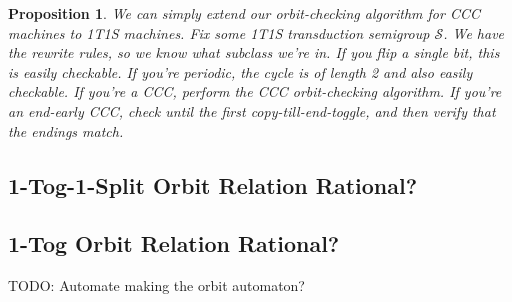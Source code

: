 \documentclass{article}
\newtheorem{proposition}{Proposition}
\newcommand{\0}{\underline{0}}
\newcommand{\1}{\underline{1}}
\newcommand{\2}{\underline{2}}
\renewcommand{\S}{\mathcal{S}}
\begin{document}
\begin{proposition}
We can simply extend our orbit-checking algorithm for CCC machines to 1T1S machines. Fix some 1T1S transduction semigroup $\S$. We have the rewrite rules, so we know what subclass we're in. If you flip a single bit, this is easily checkable. If you're periodic, the cycle is of length 2 and also easily checkable. If you're a CCC, perform the CCC orbit-checking algorithm. If you're an end-early CCC, check until the first copy-till-end-toggle, and then verify that the endings match.
\end{proposition}

\subsection*{1-Tog-1-Split Orbit Relation Rational?}

\subsection*{1-Tog Orbit Relation Rational?}

TODO: Automate making the orbit automaton?
\end{document}
